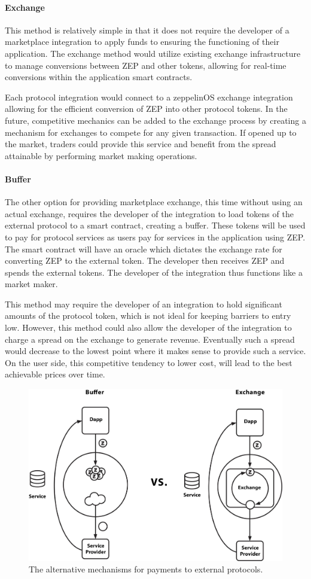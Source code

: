 \documentclass[]{article}
\makeatletter
\let\oldparagraph\paragraph
\renewcommand{\paragraph}[1]{\oldparagraph{#1}\mbox{}}
\DeclareRobustCommand{\_}{%
  \leavevmode\vbox{%
    \hrule\@width.5em
          \@height-.26ex
          \@depth\dimexpr.26ex+.28pt\relax}}
\makeatother
\begin{document}
\paragraph{Exchange}

This method is relatively simple in that it does not require the
developer of a marketplace integration to apply funds to ensuring the
functioning of their application. The exchange method would utilize
existing exchange infrastructure to manage conversions between ZEP and
other tokens, allowing for real-time conversions within the
application smart contracts.

Each protocol integration would connect to a zeppelinOS exchange integration
allowing for the efficient conversion of ZEP into other protocol tokens. In the
future, competitive mechanics can be added to the exchange process by creating
a mechanism for exchanges to compete for any given transaction. If opened up to
the market, traders could provide this service and benefit from the spread
attainable by performing market making operations.

\paragraph{Buffer}

The other option for providing marketplace exchange, this time without
using an actual exchange, requires the developer of the integration to
load tokens of the external protocol to a smart contract, creating a
buffer. These tokens will be used to pay for protocol services as users
pay for services in the application using ZEP. The smart contract will
have an oracle which dictates the exchange rate for converting ZEP to
the external token. The developer then receives ZEP and spends the
external tokens. The developer of the integration thus functions like a
market maker. 

This method may require the developer of an integration to hold
significant amounts of the protocol token, which is not ideal for
keeping barriers to entry low. However, this method could also allow the
developer of the integration to charge a spread on the exchange to
generate revenue. Eventually such a spread would decrease to the lowest
point where it makes sense to provide such a service. On the user side,
this competitive tendency to lower cost, will lead to the best
achievable prices over time.

\begin{figure}
  \centering
  \includegraphics[width=0.65\linewidth]{images/image3.jpg}
  \caption{The alternative mechanisms for payments to external protocols.}
\end{figure}
\end{document}
